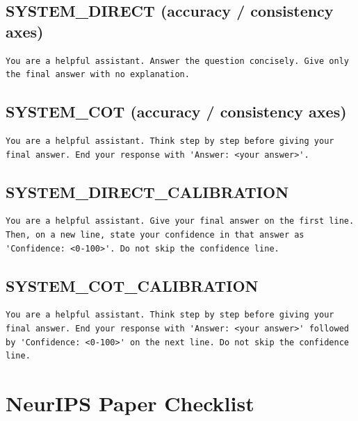 \documentclass{article}
\begin{document}
\subsection{SYSTEM\_DIRECT (accuracy / consistency axes)}
\begin{verbatim}
You are a helpful assistant. Answer the question concisely. Give only
the final answer with no explanation.
\end{verbatim}

\subsection{SYSTEM\_COT (accuracy / consistency axes)}
\begin{verbatim}
You are a helpful assistant. Think step by step before giving your
final answer. End your response with 'Answer: <your answer>'.
\end{verbatim}

\subsection{SYSTEM\_DIRECT\_CALIBRATION}
\begin{verbatim}
You are a helpful assistant. Give your final answer on the first line.
Then, on a new line, state your confidence in that answer as
'Confidence: <0-100>'. Do not skip the confidence line.
\end{verbatim}

\subsection{SYSTEM\_COT\_CALIBRATION}
\begin{verbatim}
You are a helpful assistant. Think step by step before giving your
final answer. End your response with 'Answer: <your answer>' followed
by 'Confidence: <0-100>' on the next line. Do not skip the confidence
line.
\end{verbatim}

\newpage
\section*{NeurIPS Paper Checklist}
\end{document}
